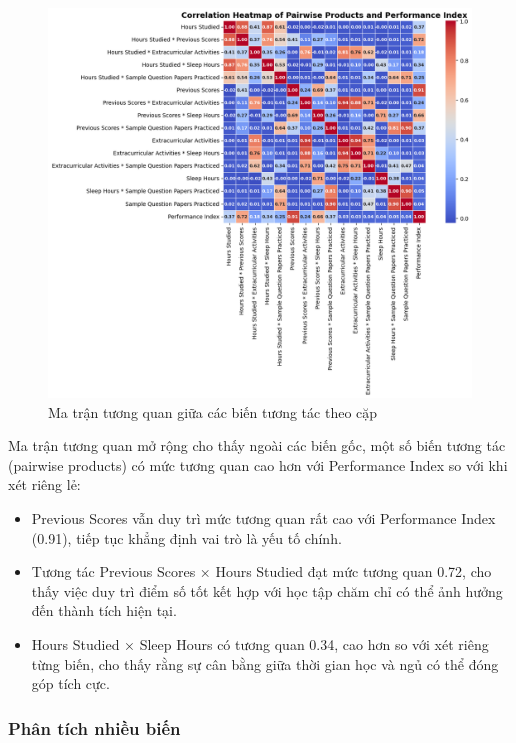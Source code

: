 \begin{figure}[H]
	\centering
	\includegraphics[width=\textwidth]{images/eda/9.png}
	\caption{Ma trận tương quan giữa các biến tương tác theo cặp}
\end{figure}

Ma trận tương quan mở rộng cho thấy ngoài các biến gốc, một số biến tương tác (pairwise products) có mức tương quan cao hơn với Performance Index so với khi xét riêng lẻ:
\begin{itemize}
	\item Previous Scores vẫn duy trì mức tương quan rất cao với Performance Index (0.91), tiếp tục khẳng định vai trò là yếu tố chính.
	\item Tương tác Previous Scores × Hours Studied đạt mức tương quan 0.72, cho thấy việc duy trì điểm số tốt kết hợp với học tập chăm chỉ có thể ảnh hưởng đến thành tích hiện tại.
	\item Hours Studied × Sleep Hours có tương quan 0.34, cao hơn so với xét riêng từng biến, cho thấy rằng sự cân bằng giữa thời gian học và ngủ có thể đóng góp tích cực.
\end{itemize}

\subsubsection{Phân tích nhiều biến}

